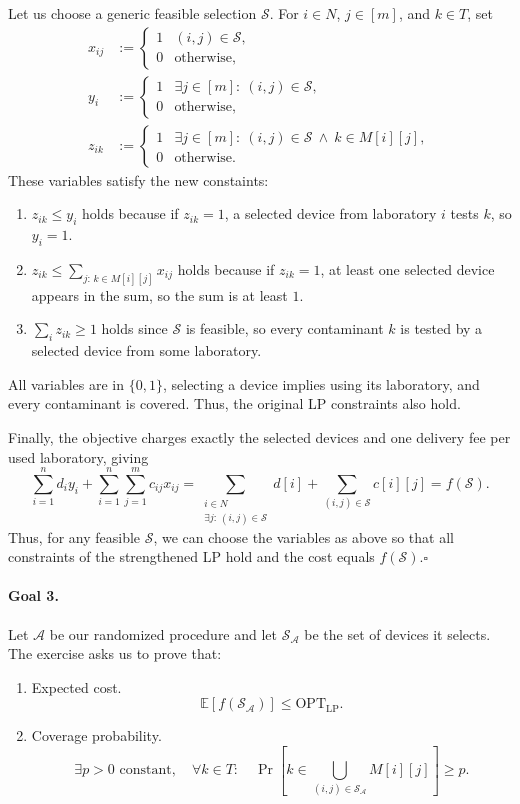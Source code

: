 \documentclass[12pt,a4paper]{article}
\begin{document}
Let us choose a generic feasible selection $\mathcal{S}$. For
$i\in N$, $j\in[m]$, and $k\in T$, set
\[
\begin{aligned}
x_{ij}&:=\begin{cases}
1 &(i,j)\in\mathcal{S},\\
0 &\text{otherwise},
\end{cases}\\[6pt]
y_i&:=\begin{cases}
1 &\exists j\in[m]:\ (i,j)\in\mathcal{S},\\
0 &\text{otherwise},
\end{cases}\\[6pt]
z_{ik}&:=\begin{cases}
1 &\exists j\in[m]:\ (i,j)\in\mathcal{S}\ \land\ k\in M[i][j],\\
0 &\text{otherwise}.
\end{cases}
\end{aligned}
\]
These variables satisfy the new constaints:
\begin{enumerate}
\item $z_{ik}\leq y_i$ holds because if $z_{ik}=1$, a selected device from laboratory
$i$ tests $k$, so $y_i=1$.
\item $z_{ik}\leq\sum_{j:\,k\in M[i][j]}x_{ij}$ holds because if $z_{ik}=1$, at
least one selected device appears in the sum, so the sum is at least $1$.
\item $\sum_i z_{ik}\geq1$ holds since $\mathcal{S}$ is feasible, so every
contaminant $k$ is tested by a selected device from some laboratory.
\end{enumerate}
All variables are in $\{0,1\}$, selecting a device implies using its
laboratory, and every contaminant is covered. Thus, the original LP
constraints also hold.

Finally, the objective charges exactly the selected devices and one
delivery fee per used laboratory, giving
\[
\sum_{i=1}^n d_i y_i+\sum_{i=1}^n\sum_{j=1}^m c_{ij}x_{ij}
=\sum_{\substack{i\in N\\\exists j:\,(i,j)\in\mathcal{S}}}d[i]
+\sum_{(i,j)\in\mathcal{S}}c[i][j]
=f(\mathcal{S}).
\]
Thus, for any feasible $\mathcal{S}$, we can choose the variables as above
so that all constraints of the strengthened LP hold and the cost equals
$f(\mathcal{S})$.\hfill$\square$

\paragraph{Goal 3.}
Let $\mathcal{A}$ be our randomized procedure and let
$\mathcal{S}_{\mathcal{A}}$ be the set of devices it selects.
The exercise asks us to prove that:
\begin{enumerate}
\item Expected cost.
\[
\mathbb{E}\!\left[f(\mathcal{S}_{\mathcal{A}})\right]
\leq\mathrm{OPT}_{\mathrm{LP}}.
\]
\item Coverage probability.
\[
\exists p>0\text{ constant},\quad
\forall k\in T:\quad
\Pr\!\left[k\in\bigcup_{(i,j)\in\mathcal{S}_{\mathcal{A}}}M[i][j]\right]
\geq p.
\]
\end{enumerate}
\end{document}

